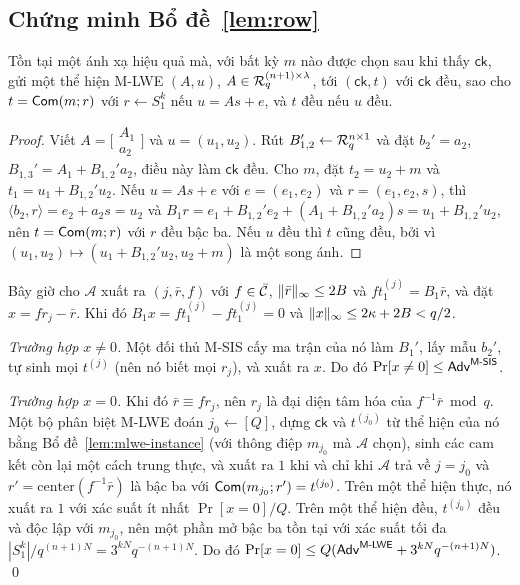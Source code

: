 \subsection{Chứng minh Bổ đề~\ref{lem:row}}

\begin{lemma}
\label{lem:mlwe-instance}
Tồn tại một ánh xạ hiệu quả mà, với bất kỳ $m$ nào được chọn sau khi thấy
$\mathsf{ck}$, gửi một thể hiện M-LWE $(A,u)$, $A\in\mathcal{R}_q^{(n+1)\times\lambda}$,
tới $(\mathsf{ck},t)$ với $\mathsf{ck}$ đều, sao cho $t=\mathsf{Com}(m;r)$ với
$r\leftarrow S_1^k$ nếu $u=As+e$, và $t$ đều nếu $u$ đều.
\end{lemma}
\begin{proof}
Viết $A=\bigl[\begin{smallmatrix}A_1\\a_2\end{smallmatrix}\bigr]$ và
$u=(u_1,u_2)$. Rút $B_{1,2}'\leftarrow\mathcal{R}_q^{n\times1}$ và đặt $b_2'=a_2$,
$B_{1,3}'=A_1+B_{1,2}'a_2$, điều này làm $\mathsf{ck}$ đều. Cho $m$, đặt
$t_2=u_2+m$ và $t_1=u_1+B_{1,2}'u_2$. Nếu $u=As+e$ với $e=(e_1,e_2)$ và
$r=(e_1,e_2,s)$, thì $\langle b_2,r\rangle=e_2+a_2s=u_2$ và
$B_1r=e_1+B_{1,2}'e_2+(A_1+B_{1,2}'a_2)s=u_1+B_{1,2}'u_2$, nên $t=\mathsf{Com}(m;r)$
với $r$ đều bậc ba. Nếu $u$ đều thì $t$ cũng đều, bởi vì
$(u_1,u_2)\mapsto(u_1+B_{1,2}'u_2,u_2+m)$ là một song ánh.
\end{proof}

Bây giờ cho $\mathcal A$ xuất ra $(j,\bar r,f)$ với $f\in\bar{\mathcal{C}}$,
$\lVert \bar r \rVert_\infty\le2B$ và $ft^{(j)}_1=B_1\bar r$, và đặt $x=fr_j-\bar r$.
Khi đó $B_1x=ft_1^{(j)}-ft_1^{(j)}=0$ và $\lVert x \rVert_\infty\le2\kappa+2B<q/2$.

\emph{Trường hợp $x\neq0$.} Một đối thủ M-SIS cấy ma trận của nó làm $B_1'$,
lấy mẫu $b_2'$, tự sinh mọi $t^{(j)}$ (nên nó biết mọi $r_j$), và xuất ra
$x$. Do đó $\Pr[x\neq0]\le\mathsf{Adv}^{\textsf{M-SIS}}$.

\emph{Trường hợp $x=0$.} Khi đó $\bar r\equiv fr_j$, nên $r_j$ là đại diện tâm
hóa của $f^{-1}\bar r\bmod q$. Một bộ phân biệt M-LWE đoán
$j_0\leftarrow[Q]$, dựng $\mathsf{ck}$ và $t^{(j_0)}$ từ thể hiện của nó bằng
Bổ đề~\ref{lem:mlwe-instance} (với thông điệp $m_{j_0}$ mà $\mathcal A$
chọn), sinh các cam kết còn lại một cách trung thực, và xuất ra $1$ khi và chỉ
khi $\mathcal A$ trả về $j=j_0$ và $r'=\mathrm{center}(f^{-1}\bar r)$ là bậc ba
với $\mathsf{Com}(m_{j_0};r')=t^{(j_0)}$. Trên một thể hiện thực, nó xuất ra $1$ với
xác suất ít nhất $\Pr[x=0]/Q$. Trên một thể hiện đều, $t^{(j_0)}$ đều và độc
lập với $m_{j_0}$, nên một phần mở bậc ba tồn tại với xác suất tối đa
$|S_1^k|/q^{(n+1)N}=3^{kN}q^{-(n+1)N}$. Do đó
$\Pr[x=0]\le Q(\mathsf{Adv}^{\textsf{M-LWE}}+3^{kN}q^{-(n+1)N})$. \qed

